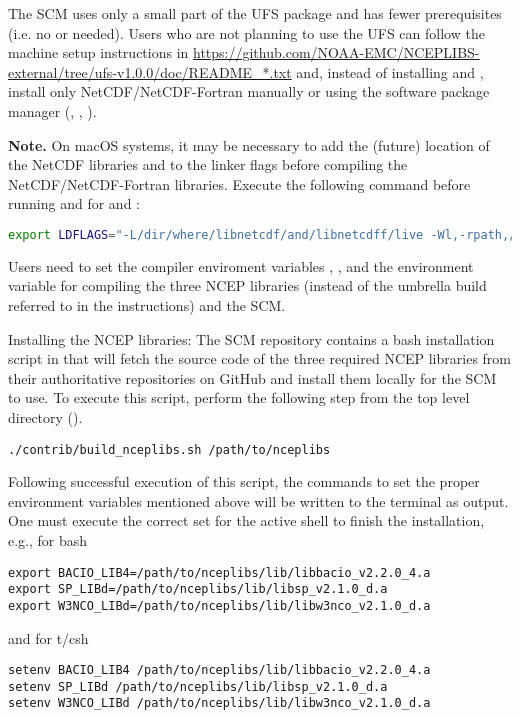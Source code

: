 The SCM uses only a small part of the UFS  package and has fewer prerequisites (i.e. no  or  needed). Users who are not planning to use the UFS can follow the machine setup instructions in \url{https://github.com/NOAA-EMC/NCEPLIBS-external/tree/ufs-v1.0.0/doc/README_*.txt} and, instead of installing  and , install only NetCDF/NetCDF-Fortran manually or using the software package manager (, , ).

\textbf{Note.} On macOS systems, it may be necessary to add the (future) location of the NetCDF libraries  and  to the  linker flags before compiling the NetCDF/NetCDF-Fortran libraries. Execute the following command before running  and  for  and :
\begin{lstlisting}[language=bash]
export LDFLAGS="-L/dir/where/libnetcdf/and/libnetcdff/live -Wl,-rpath,/dir/where/libnetcdf/and/libnetcdff/live"
\end{lstlisting}

Users need to set the compiler enviroment variables ,  ,  and the environment variable  for compiling the three NCEP libraries (instead of the  umbrella build referred to in the  instructions) and the SCM.

Installing the NCEP libraries: The SCM repository contains a bash installation script in  that will fetch the source code of the three required NCEP libraries from their authoritative repositories on GitHub and install them locally for the SCM to use. To execute this script, perform the following step from the top level directory ().
\begin{lstlisting}
./contrib/build_nceplibs.sh /path/to/nceplibs
\end{lstlisting}

Following successful execution of this script, the commands to set the proper environment variables mentioned above will be written to the terminal as output. One must execute the correct set for the active shell to finish the installation, e.g., for bash
\begin{lstlisting}
export BACIO_LIB4=/path/to/nceplibs/lib/libbacio_v2.2.0_4.a
export SP_LIBd=/path/to/nceplibs/lib/libsp_v2.1.0_d.a
export W3NCO_LIBd=/path/to/nceplibs/lib/libw3nco_v2.1.0_d.a
\end{lstlisting}
and for t/csh
\begin{lstlisting}
setenv BACIO_LIB4 /path/to/nceplibs/lib/libbacio_v2.2.0_4.a
setenv SP_LIBd /path/to/nceplibs/lib/libsp_v2.1.0_d.a
setenv W3NCO_LIBd /path/to/nceplibs/lib/libw3nco_v2.1.0_d.a
\end{lstlisting}

